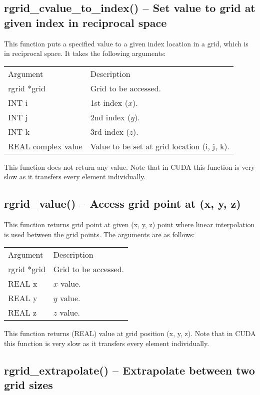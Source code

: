 \documentclass[12pt,letterpaper]{report}
\begin{document}
\subsection{rgrid\_cvalue\_to\_index() -- Set value to grid at given index in reciprocal space}

This function puts a specified value to a given index location in a grid, which is in reciprocal space. It takes the following arguments:
\begin{longtable}{p{} p{}}
Argument & Description\\
\cline{1-2}
rgrid *grid & Grid to be accessed.\\
INT i & 1st index ($x$).\\
INT j & 2nd index ($y$).\\
INT k & 3rd index ($z$).\\
REAL complex value & Value to be set at grid location (i, j, k).\\
\end{longtable}
\noindent
This function does not return any value. Note that in CUDA this function is very slow as it transfers every element individually.

\subsection{rgrid\_value() -- Access grid point at (x, y, z)}

This function returns grid point at given (x, y, z) point where linear interpolation is used between the grid points. The arguments are as follows:
\begin{longtable}{p{} p{}}
Argument & Description\\
\cline{1-2}
rgrid *grid & Grid to be accessed.\\
REAL x & $x$ value.\\
REAL y & $y$ value.\\
REAL z & $z$ value.\\
\end{longtable}
\noindent
This function returns (REAL) value at grid position (x, y, z). Note that in CUDA this function is very slow as it transfers every element individually.

\subsection{rgrid\_extrapolate() -- Extrapolate between two grid sizes}
\end{document}
